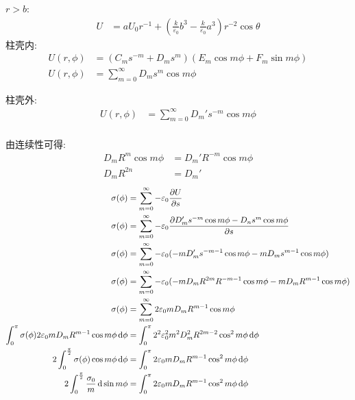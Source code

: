 $r>b$:
\begin{align*}
        U&=
aU_0 r^{-1}
+\left(\frac{k}{\varepsilon_0} b^{3}
-\frac{k}{\varepsilon_0} a^{3}\right) r^{-2}\cos\theta
\end{align*}
柱壳内:
\begin{align*}
    U(r,\phi)
&=
\left(C_ms^{-m}+D_ms^{m}\right)(E_m\cos m\phi+F_m\sin m\phi)\\
    U(r,\phi)
&=
\sum_{m=0}^{\infty}D_ms^{m}\cos m\phi
\end{align*}

柱壳外:\begin{align*}
    U(r,\phi)
&=
\sum_{m=0}^{\infty}D_m's^{-m}\cos m\phi\\
\end{align*}

由连续性可得:
\begin{align*}
    D_mR^{m}\cos m\phi&=D_m'R^{-m}\cos m\phi\\
    D_mR^{2n}&=D_m'
\end{align*}
\begin{align*}
    \sigma(\phi)&=\sum_{m=0}^{\infty}-\varepsilon_0\frac{\partial U}{\partial s}\\
    \sigma(\phi)&=\sum_{m=0}^{\infty}-\varepsilon_0\frac{\partial D_m's^{-m}\cos m\phi-D_ns^{m}\cos m\phi}{\partial s}\\
    \sigma(\phi)&=\sum_{m=0}^{\infty}-\varepsilon_0(-mD_m's^{-m-1}\cos m\phi-mD_ms^{m-1}\cos m\phi)\\
    \sigma(\phi)&=\sum_{m=0}^{\infty}-\varepsilon_0(-mD_mR^{2m}R^{-m-1}\cos m\phi-mD_mR^{m-1}\cos m\phi)\\
    \sigma(\phi)&=\sum_{m=0}^{\infty}2\varepsilon_0mD_mR^{m-1}\cos m\phi\\
    \int_{0}^{\pi}\sigma(\phi)2\varepsilon_0mD_mR^{m-1}\cos m\phi\dif \phi
    &=\int_{0}^{\pi}2^2\varepsilon_0^2m^2D_m^2R^{2m-2}\cos^2 m\phi\dif \phi\\
    2\int_{0}^{\frac{\pi}{2}}\sigma(\phi)\cos m\phi\dif \phi
    &=\int_{0}^{\pi}2\varepsilon_0mD_mR^{m-1}\cos^2 m\phi\dif \phi\\
    2\int_{0}^{\frac{\pi}{2}}\frac{\sigma_0}{m}\dif \sin m\phi
    &=\int_{0}^{\pi}2\varepsilon_0mD_mR^{m-1}\cos^2 m\phi\dif \phi
\end{align*}

